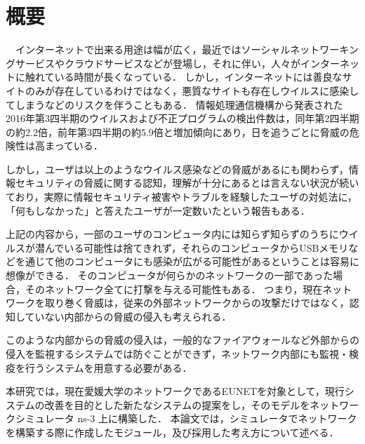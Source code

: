 \chapter*{概要}

　インターネットで出来る用途は幅が広く，最近ではソーシャルネットワーキングサービスやクラウドサービスなどが登場し，それに伴い，人々がインターネットに触れている時間が長くなっている．
しかし，インターネットには善良なサイトのみが存在しているわけではなく，悪質なサイトも存在しウイルスに感染してしまうなどのリスクを伴うこともある．
情報処理通信機構から発表された2016年第3四半期のウイルスおよび不正プログラムの検出件数は，同年第2四半期の約2.2倍，前年第3四半期の約5.9倍と増加傾向にあり\cite{joron2}，日を追うごとに脅威の危険性は高まっている．

しかし，ユーザは以上のようなウイルス感染などの脅威があるにも関わらず，情報セキュリティの脅威に関する認知，理解が十分にあるとは言えない状況が続いており，実際に情報セキュリティ被害やトラブルを経験したユーザの対処法に，「何もしなかった」と答えたユーザが一定数いたという報告もある\cite{joron1}．

上記の内容から，一部のユーザのコンピュータ内には知らず知らずのうちにウイルスが潜んでいる可能性は捨てきれず，それらのコンピュータからUSBメモリなどを通じて他のコンピュータにも感染が広がる可能性があるということは容易に想像ができる．
そのコンピュータが何らかのネットワークの一部であった場合，そのネットワーク全てに打撃を与える可能性もある．
つまり，現在ネットワークを取り巻く脅威は，従来の外部ネットワークからの攻撃だけではなく，認知していない内部からの脅威の侵入も考えられる．

このような内部からの脅威の侵入は，一般的なファイアウォールなど外部からの侵入を監視するシステムでは防ぐことができず，ネットワーク内部にも監視・検疫を行うシステムを用意する必要がある．

本研究では，現在愛媛大学のネットワークであるEUNETを対象として，現行システムの改善を目的とした新たなシステムの提案をし，そのモデルをネットワークシミュレータ ns-3 上に構築した．
本論文では，シミュレータでネットワークを構築する際に作成したモジュール，及び採用した考え方について述べる．